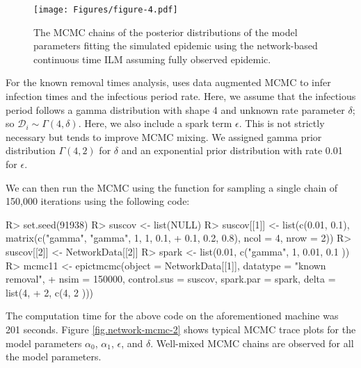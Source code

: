 \documentclass[nojss,shortnames]{jss}
\begin{document}
\begin{figure}[!h]
\begin{center}
\texttt{[image: Figures/figure-4.pdf]}
\caption{The MCMC chains of the posterior distributions of the model parameters fitting the simulated epidemic using the network-based continuous time ILM assuming fully observed epidemic.}
\label{fig.network-mcmc-1}
\end{center}
\end{figure}

For the known removal times analysis,  uses data augmented MCMC to infer infection times and the infectious period rate. Here, we assume that the infectious period follows a gamma distribution with shape 4 and unknown rate parameter $\delta$; so $\mathcal{D}_{i} \sim \Gamma(4, \delta)$. Here, we also include a spark term $\epsilon$. This is not strictly necessary but tends to improve MCMC mixing. We assigned gamma prior distribution $\Gamma(4,2)$ for $\delta$ and an exponential prior distribution with rate 0.01 for $\epsilon$.

We can then run the MCMC using the  function for sampling a single chain of 150,000 iterations using the following code:

\begin{Sinput}
R> set.seed(91938)
R> suscov <- list(NULL)
R> suscov[[1]] <- list(c(0.01, 0.1), matrix(c("gamma", "gamma", 1, 1, 0.1, 
+    0.1, 0.2, 0.8), ncol = 4, nrow = 2))
R> suscov[[2]] <- NetworkData[[2]]
R> spark <- list(0.01, c("gamma", 1, 0.01, 0.1 ))
R> mcmc11 <- epictmcmc(object = NetworkData[[1]], datatype = "known removal", 
+    nsim = 150000, control.sus = suscov, spark.par = spark, delta = list(4, 
+    2, c(4, 2 )))
\end{Sinput}

The computation time for the above code on the aforementioned machine was 201 seconds. Figure \ref{fig.network-mcmc-2} shows typical MCMC trace plots for the model parameters $\alpha_{0}$, $\alpha_{1}$, $\epsilon$, and $\delta$. Well-mixed MCMC chains are observed for all the model parameters. 
\end{document}
